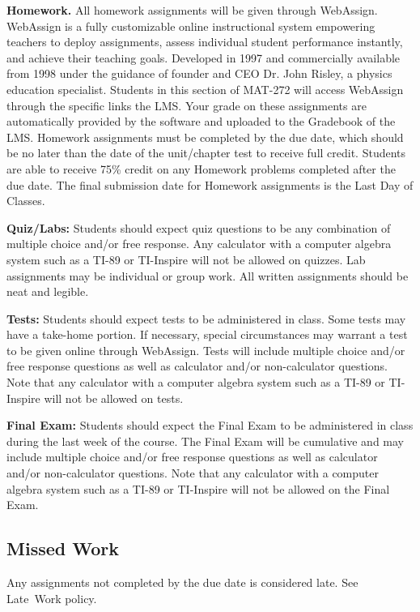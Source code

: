 \documentclass{article}
\begin{document}
\textbf{Homework.} All homework assignments will be given through WebAssign. WebAssign is a fully customizable online instructional system empowering teachers to deploy assignments, assess individual student performance instantly, and achieve their teaching goals. Developed in 1997 and commercially available from 1998 under the guidance of founder and CEO Dr. John Risley, a physics education specialist. Students in this section of MAT-272 will access WebAssign through the specific links the LMS. Your grade on these assignments are automatically provided by the software and uploaded to the Gradebook of the LMS. Homework assignments must be completed by the due date, which should be no later than the date of the unit/chapter test to receive full credit. Students are able to receive 75\% credit on any Homework problems completed after the due date. The final submission date for Homework assignments is the Last Day of Classes.

\textbf{Quiz/Labs:} Students should expect quiz questions to be any combination of multiple choice and/or free response. Any calculator with a computer algebra system such as a TI-89 or TI-Inspire will not be allowed on quizzes. Lab assignments may be individual or group work. All written assignments should be neat and legible.

\textbf{Tests:} Students should expect tests to be administered in class. Some tests may have a take-home portion. If necessary, special circumstances may warrant a test to be given online through WebAssign. Tests will include multiple choice and/or free response questions as well as calculator and/or non-calculator questions. Note that any calculator with a computer algebra system such as a TI-89 or TI-Inspire will not be allowed on tests.

\textbf{Final Exam:} Students should expect the Final Exam to be administered in class during the last week of the course. The Final Exam will be cumulative and may include multiple choice and/or free response questions as well as calculator and/or non-calculator questions. Note that any calculator with a computer algebra system such as a TI-89 or TI-Inspire will not be allowed on the Final Exam.

\subsection{Missed Work}

Any assignments not completed by the due date is considered late. See Late~Work policy.
\end{document}
